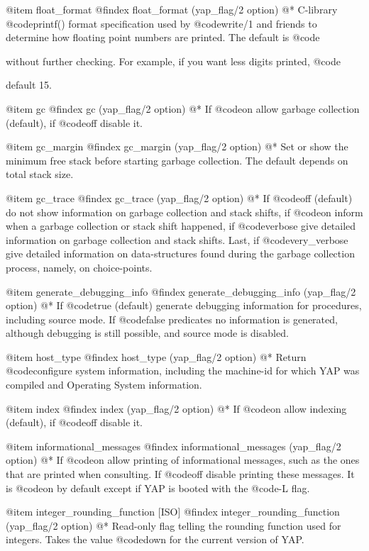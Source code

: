 {{{{{{{@item float_format
@findex float_format (yap_flag/2 option)
@* C-library @code{printf()} format specification used by @code{write/1} and
friends to determine how floating point numbers are printed. The
default is @code{%
without further checking. For example, if you want less digits
printed, @code{%
default 15.

@item  gc
@findex gc (yap_flag/2 option)
@*
If @code{on} allow garbage collection (default), if @code{off} disable it.

@item  gc_margin
@findex gc_margin (yap_flag/2 option)
@*
Set or show the minimum free stack before starting garbage
collection. The default depends on total stack size. 

@item  gc_trace
@findex gc_trace (yap_flag/2 option)
@* If @code{off} (default) do not show information on garbage collection
and stack shifts, if @code{on} inform when a garbage collection or stack
shift happened, if @code{verbose} give detailed information on garbage
collection and stack shifts. Last, if @code{very_verbose} give detailed
information on data-structures found during the garbage collection
process, namely, on choice-points.

@item  generate_debugging_info
@findex generate_debugging_info (yap_flag/2 option)
@* If @code{true} (default) generate debugging information for
procedures, including source mode. If @code{false} predicates no
information is generated, although debugging is still possible, and
source mode is disabled.

@item  host_type
@findex host_type (yap_flag/2 option)
@* Return @code{configure} system information, including the machine-id
for which YAP was compiled and Operating System information. 

@item  index
@findex index (yap_flag/2 option)
@*
If @code{on} allow indexing (default), if @code{off} disable it.

@item  informational_messages
@findex informational_messages (yap_flag/2 option)
@*
If @code{on} allow printing of informational messages, such as the ones
that are printed when consulting. If @code{off} disable printing
these messages. It is @code{on} by default except if YAP is booted with
the @code{-L} flag.

@item integer_rounding_function [ISO]
@findex integer_rounding_function (yap_flag/2 option)
@*
Read-only flag telling the rounding function used for integers. Takes the value
@code{down} for the current version of YAP.

}}}}}}}}}
